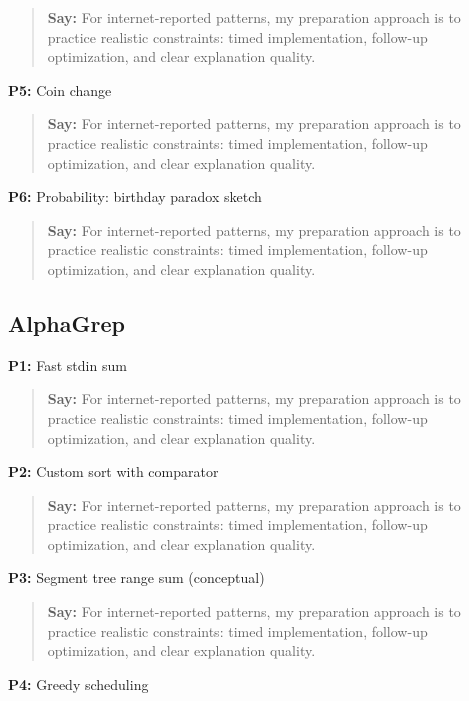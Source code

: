 \documentclass[9pt,a4paper]{article}
\begin{document}
\begin{quote}\small\textbf{Say:} For internet-reported patterns, my preparation approach is to practice realistic constraints: timed implementation, follow-up optimization, and clear explanation quality.\end{quote}
\vspace{2mm}
\textbf{P5:} Coin change

\begin{quote}\small\textbf{Say:} For internet-reported patterns, my preparation approach is to practice realistic constraints: timed implementation, follow-up optimization, and clear explanation quality.\end{quote}
\vspace{2mm}
\textbf{P6:} Probability: birthday paradox sketch

\begin{quote}\small\textbf{Say:} For internet-reported patterns, my preparation approach is to practice realistic constraints: timed implementation, follow-up optimization, and clear explanation quality.\end{quote}
\vspace{2mm}
\subsection{AlphaGrep}
\textbf{P1:} Fast stdin sum

\begin{quote}\small\textbf{Say:} For internet-reported patterns, my preparation approach is to practice realistic constraints: timed implementation, follow-up optimization, and clear explanation quality.\end{quote}
\vspace{2mm}
\textbf{P2:} Custom sort with comparator

\begin{quote}\small\textbf{Say:} For internet-reported patterns, my preparation approach is to practice realistic constraints: timed implementation, follow-up optimization, and clear explanation quality.\end{quote}
\vspace{2mm}
\textbf{P3:} Segment tree range sum (conceptual)

\begin{quote}\small\textbf{Say:} For internet-reported patterns, my preparation approach is to practice realistic constraints: timed implementation, follow-up optimization, and clear explanation quality.\end{quote}
\vspace{2mm}
\textbf{P4:} Greedy scheduling
\end{document}
